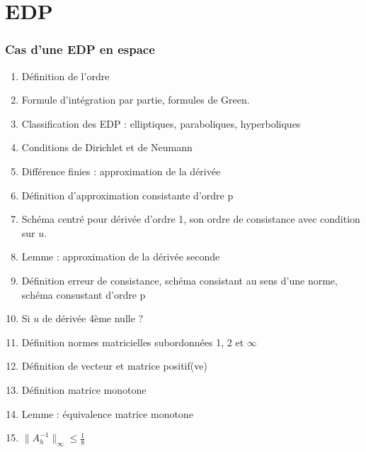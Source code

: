 \documentclass[11pt, twocolumn, landscape]{article}
\begin{document}
\newpage
\part{EDP}
\section{Cas d'une EDP en espace}
\begin{enumerate}
\item Définition de l'ordre
\item Formule d'intégration par partie, formules de Green.
\item Classification des EDP : elliptiques, paraboliques, hyperboliques
\item Conditions de Dirichlet et de Neumann
\item Différence finies : approximation de la dérivée
\item Définition d'approximation consistante d'ordre p
\item Schéma centré pour dérivée d'ordre 1, son ordre de consistance avec condition sur $u$.
\item Lemme : approximation de la dérivée seconde
\item Définition erreur de consistance, schéma consistant au sens d'une norme, schéma consustant d'ordre p
\item Si $u$ de dérivée 4ème nulle ?
\item Définition normes matricielles subordonnées 1, 2 et $\infty$
\item Définition de vecteur et matrice positif(ve)
\item Définition matrice monotone
\item Lemme : équivalence matrice monotone
\item \bf{$\|A_h^{-1}\|_{\infty}\leq \frac{1}{8}$}
\end{enumerate}
\end{document}
